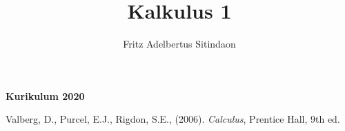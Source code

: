\documentclass{article}
\title{Kalkulus 1}
\author{Fritz Adelbertus Sitindaon}
\date{}
\newcommand{\ds}{\displaystyle}
\begin{document}
\begin{center}
    \textbf{}

    \vspace{0.5cm}
    \textbf{\Large Kurikulum 2020}

    \vspace{7cm}
    \scalebox{15}{$\ds \lim_{x \to \infty}$}
\end{center}
\thispagestyle{empty}
\newpage
\tableofcontents

% 
% 
% 
% 
% 
% 
% 
% 
% 
% 
% 
% 

\begin{thebibliography}{9}
Valberg, D., Purcel, E.J., Rigdon, S.E., (2006). \emph{Calculus}, Prentice Hall, 9th ed.
\end{thebibliography}
\end{document}
